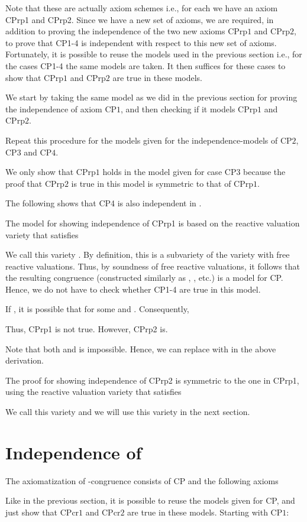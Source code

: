 \documentclass[a4paper,twoside,openright]{report}
\newcommand{\CP}[1]{\ensuremath{\mathrm{CP#1}}}
\newcommand{\CPrp}[1]{\ensuremath{\mathrm{CPrp#1}}}
\newcommand{\CPcr}[1]{\ensuremath{\mathrm{CPcr#1}}}
\begin{document}
Note that these are actually axiom schemes i.e., for each  we have an axiom CPrp1 and CPrp2. Since we have a new set of axioms, we are required, in addition to proving the independence of the two new axioms \CPrp1 and \CPrp2, to prove that CP1-4 is independent with respect to this new set of axioms. Fortunately, it is possible to reuse the models used in the previous section i.e., for the cases CP1-4 the same models are taken. It then suffices for these cases to show that \CPrp1 and \CPrp2 are true in these models.

We start by taking the same model as we did in the previous section for proving the independence of axiom \CP1, and then checking if it models \CPrp1 and \CPrp2.


Repeat this procedure for the models given for the independence-models of \CP2, \CP3 and \CP4.


We only show that \CPrp1 holds in the model given for case \CP3 because the proof that \CPrp2 is true in this model is symmetric to that of \CPrp1.


The following shows that CP4 is also independent in .


The model for showing independence of CPrp1 is based on the reactive valuation variety that satisfies

We call this variety . By definition, this is a subvariety of the variety with free reactive valuations. Thus, by soundness of free reactive valuations, it follows that the resulting congruence  (constructed similarly as , , etc.) is a model for CP. Hence, we do not have to check whether CP1-4 are true in this model.

If , it is possible that  for some  and . Consequently,

Thus, CPrp1 is not true. However, CPrp2 is.


Note that both  and  is impossible. Hence, we can replace  with  in the above derivation.

The proof for showing independence of CPrp2 is symmetric to the one in CPrp1, using the reactive valuation variety that satisfies

We call this variety  and we will use this variety in the next section.

\section{Independence of }
The axiomatization of -congruence consists of CP and the following axioms

Like in the previous section, it is possible to reuse the models given for CP, and just show that \CPcr1 and \CPcr2 are true in these models. Starting with \CP1:
\end{document}
